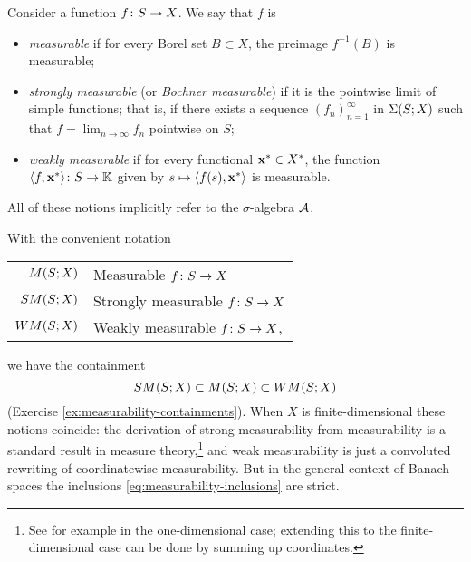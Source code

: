 \begin{defn}
  Consider a function $f \colon S \rightarrow X$.
  We say that $f$ is
  \begin{itemize}
  \item
    \emph{measurable} if for every Borel set $B \subset X$, the preimage $f^{-1}(B)$ is measurable;
  \item
    \emph{strongly measurable} (or \emph{Bochner measurable}) if it is the pointwise limit of simple functions; that is, if there exists a sequence $(f_n)_{n=1}^\infty$ in $\Sigma(S;X)$ such that $f = \lim_{n \to \infty} f_n$ pointwise on $S$;
  \item
    \emph{weakly measurable} if for every functional $\mathbf{x}^* \in X^*$, the function $\langle f, \mathbf{x}^*\rangle \colon S \rightarrow \mathbb{K}$ given by $s \mapsto \langle f(s), \mathbf{x}^* \rangle$ is measurable.
  \end{itemize}
  All of these notions implicitly refer to the $\sigma$-algebra $\mathcal{A}$.

  
\end{defn}

With the convenient notation
\begin{center}
  \begin{tabular}{r|l}
    $M (S;X)$  & Measurable $f \colon S \rightarrow X$    \\
    $SM(S;X)$  & Strongly measurable $f \colon S \rightarrow X$ \\
    $WM(S;X)$  & Weakly measurable $f \colon S \rightarrow X$,
  \end{tabular}
\end{center}
we have the containment
\begin{equation}\label{eq:measurability-inclusions}
  SM(S;X) \subset M(S;X) \subset WM(S;X)
\end{equation}
(Exercise \ref{ex:measurability-containments}).
When $X$ is finite-dimensional these notions coincide: the derivation of strong measurability from measurability is a standard result in measure theory,\footnote{See for example \cite[Corollary 4.2.7]{rD04} in the one-dimensional case; extending this to the finite-dimensional case can be done by summing up coordinates.} and weak measurability is just a convoluted rewriting of coordinatewise measurability.
But in the general context of Banach spaces the inclusions \eqref{eq:measurability-inclusions} are strict.

